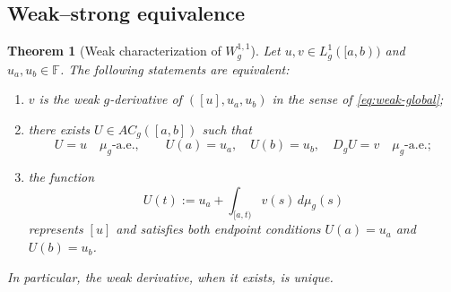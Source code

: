 \documentclass[preprint,12pt]{elsarticle}
\newcommand{\rev}[1]{{\color{red}#1}}
\newcommand{\rev}[1]{#1}
\newtheorem{theorem}{Theorem}[section]
\theoremstyle{definition}
\theoremstyle{remark}
\newcommand{\F}{\mathbb F}
\newcommand{\mug}{\mu_g}
\newcommand{\ACg}{AC_g}
\begin{document}
\subsection{Weak--strong equivalence}

\begin{theorem}[Weak characterization of $W_g^{1,1}$]\label{thm:weak-strong}
Let $u,v\in L_g^1([a,b))$ and $u_a,u_b\in\F$. The following statements are equivalent:
\begin{enumerate}[label=\roman*)]
 \item $v$ is the weak $g$-derivative of $([u],u_a,u_b)$ in the sense of \eqref{eq:weak-global};
 \item there exists $U\in\ACg([a,b])$ such that
 \[
 U=u\quad\mug\text{-a.e.},\qquad
 U(a)=u_a,\quad U(b)=u_b,\quad D_gU=v\quad\mug\text{-a.e.};
 \]
 \item the function
 \begin{equation}\label{eq:weak-reconstruction}
 U(t):=u_a+\int_{[a,t)}v(s)\,d\mug(s)
 \end{equation}
 \rev{represents \([u]\) and satisfies both endpoint conditions
 \(U(a)=u_a\) and \(U(b)=u_b\).}
\end{enumerate}
In particular, the weak derivative, when it exists, is unique.
\end{theorem}
\end{document}

